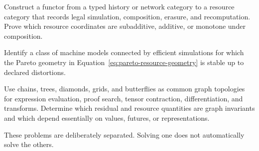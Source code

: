 \begin{problem}
Construct a functor from a typed history or network category to a resource
category that records legal simulation, composition, erasure, and
recomputation.  Prove which resource coordinates are subadditive, additive, or
monotone under composition.
\end{problem}

\begin{problem}
Identify a class of machine models connected by efficient simulations for which
the Pareto geometry in Equation~\eqref{eq:pareto-resource-geometry} is stable up
to declared distortions.
\end{problem}

\begin{problem}
Use chains, trees, diamonds, grids, and butterflies as common graph topologies
for expression evaluation, proof search, tensor contraction, differentiation,
and transforms.  Determine which residual and resource quantities are graph
invariants and which depend essentially on values, futures, or representations.
\end{problem}

These problems are deliberately separated.  Solving one does not automatically
solve the others.
